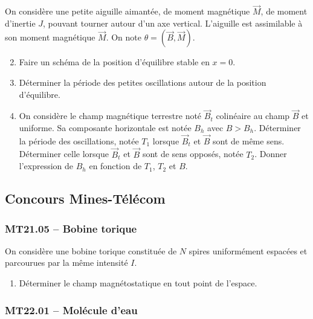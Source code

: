 On considère une petite aiguille aimantée, de moment magnétique $\overrightarrow{M}$, de moment d'inertie $J$, pouvant tourner autour d'un axe vertical. L'aiguille est assimilable à son moment magnétique $\overrightarrow{M}$. On note $\theta = (\overrightarrow{B}, \overrightarrow{M})$.

\begin{enumerate}
    \setcounter{enumi}{1}
    \item Faire un schéma de la position d'équilibre stable en $x=0$.
    \item Déterminer la période des petites oscillations autour de la position d'équilibre.
    \item On considère le champ magnétique terrestre noté $\overrightarrow{B}_t$ colinéaire au champ $\overrightarrow{B}$ et uniforme. Sa composante horizontale est notée $B_h$ avec $B > B_h$. Déterminer la période des oscillations, notée $T_1$ lorsque $\overrightarrow{B}_t$ et $\overrightarrow{B}$ sont de même sens. Déterminer celle lorsque $\overrightarrow{B}_t$ et $\overrightarrow{B}$ sont de sens opposés, notée $T_2$. Donner l'expression de $B_h$ en fonction de $T_1$, $T_2$ et $B$.
\end{enumerate}

\newpage
\subsection*{Concours Mines-Télécom}
\subsubsection*{MT21.05 -- Bobine torique}

On considère une bobine torique constituée de $N$ spires uniformément espacées et parcourues par la même intensité $I$.

\begin{enumerate}
    \item Déterminer le champ magnétostatique en tout point de l'espace.
\end{enumerate}

\subsubsection*{MT22.01 -- Molécule d'eau  \corrige}

